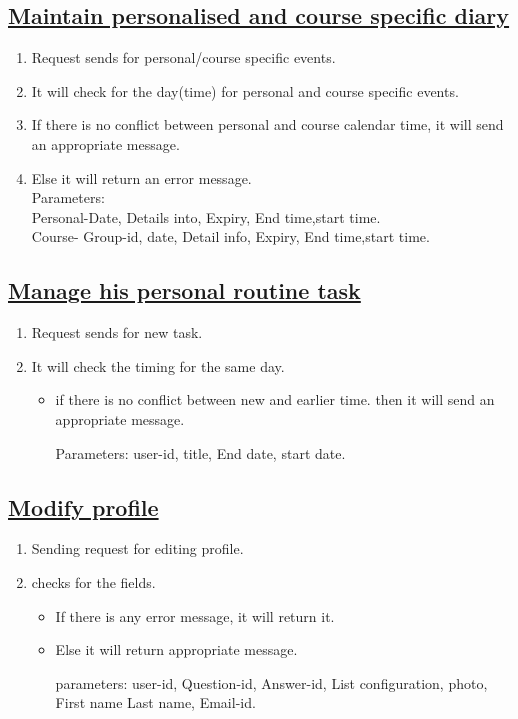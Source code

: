 \documentclass{article}
\begin{document}
\subsection*{\underline{Maintain personalised and course specific diary}}
\begin{enumerate}
	\item Request sends for personal/course specific events.
	\item It will check for the day(time) for personal and course specific events.
	    		\item If there is no conflict between personal and course calendar time, it will send an appropriate message.
		\item Else it will return an error message.\\
			            Parameters:\\  
					Personal-Date, Details into, Expiry, End time,start time.\\
				        Course- Group-id, date, Detail info, Expiry, End time,start time.\\
	\end{enumerate}

\subsection*{\underline{Manage his personal routine task}}
\begin{enumerate}
	\item Request sends for new task.
	\item It will check the timing for the same day.
	\begin{itemize}
		\item if there is no conflict between new and earlier time. then it will send an appropriate message.

		        Parameters: user-id, title, End date, start date.
	\end{itemize}

\begin{center}

\end{center}
\end{enumerate}

\subsection*{\underline{Modify profile}}
\begin{enumerate}
	\item Sending request for editing profile.
	\item checks for the fields.
	   \begin{itemize}
		\item If there is any error message, it will return it.
		\item Else it will return appropriate message.

			       parameters: user-id, Question-id, Answer-id, List configuration, photo, First name Last name, Email-id.
	    \end{itemize}
\begin{center}

\end{center}
\end{enumerate}
\end{document}
